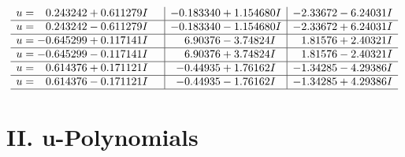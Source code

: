 \documentclass[1p]{elsarticle_modified}
\theoremstyle{definition}
\begin{document}
$$\begin{array}{c|c|c}
\begin{aligned}
u &= \phantom{-}0.243242 + 0.611279 I\end{aligned}
 & -0.183340 + 1.154680 I & -2.33672 - 6.24031 I \\ \hline\begin{aligned}
u &= \phantom{-}0.243242 - 0.611279 I\end{aligned}
 & -0.183340 - 1.154680 I & -2.33672 + 6.24031 I \\ \hline\begin{aligned}
u &= -0.645299 + 0.117141 I\end{aligned}
 & \phantom{-}6.90376 - 3.74824 I & \phantom{-}1.81576 + 2.40321 I \\ \hline\begin{aligned}
u &= -0.645299 - 0.117141 I\end{aligned}
 & \phantom{-}6.90376 + 3.74824 I & \phantom{-}1.81576 - 2.40321 I \\ \hline\begin{aligned}
u &= \phantom{-}0.614376 + 0.171121 I\end{aligned}
 & -0.44935 + 1.76162 I & -1.34285 - 4.29386 I \\ \hline\begin{aligned}
u &= \phantom{-}0.614376 - 0.171121 I\end{aligned}
 & -0.44935 - 1.76162 I & -1.34285 + 4.29386 I\\
 \hline 
 \end{array}$$\newpage
\newpage\renewcommand{\arraystretch}{1}
\centering \section*{ II. u-Polynomials}
\end{document}
